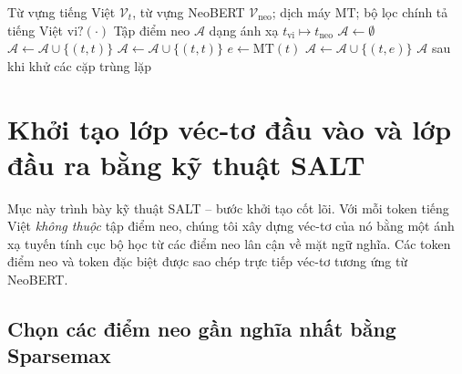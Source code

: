 \begin{algorithm}[ht]
  \caption{Trích xuất tập điểm neo từ ba nguồn}
  \label{alg:anchor}
  \begin{algorithmic}[1]
    \Require Từ vựng tiếng Việt $\mathcal{V}_t$, từ vựng NeoBERT $\mathcal{V}_{\mathrm{neo}}$;
      dịch máy $\mathrm{MT}$; bộ lọc chính tả tiếng Việt $\mathrm{vi?}(\cdot)$
    \Ensure Tập điểm neo $\mathcal{A}$ dạng ánh xạ $t_{\mathrm{vi}} \mapsto t_{\mathrm{neo}}$
    \State $\mathcal{A} \gets \emptyset$
        \State $\mathcal{A} \gets \mathcal{A} \cup \{(t, t)\}$
      \EndIf
    \EndFor
      \State $\mathcal{A} \gets \mathcal{A} \cup \{(t, t)\}$
    \EndFor
      \State $e \gets \mathrm{MT}(t)$
        \State $\mathcal{A} \gets \mathcal{A} \cup \{(t, e)\}$
      \EndIf
    \EndFor
    \State \Return $\mathcal{A}$ sau khi khử các cặp trùng lặp
  \end{algorithmic}
\end{algorithm}

\section{Khởi tạo lớp véc-tơ đầu vào và lớp đầu ra bằng kỹ thuật SALT}
\label{sec:salt-proj}

Mục này trình bày kỹ thuật SALT -- bước khởi tạo cốt lõi. Với mỗi token tiếng Việt
\textit{không thuộc} tập điểm neo, chúng tôi xây dựng véc-tơ của nó bằng một ánh xạ tuyến tính cục
bộ học từ các điểm neo lân cận về mặt ngữ nghĩa. Các token điểm neo và token đặc biệt được sao chép
trực tiếp véc-tơ tương ứng từ NeoBERT.

\subsection{Chọn các điểm neo gần nghĩa nhất bằng Sparsemax}
\label{subsec:anchor-select}

